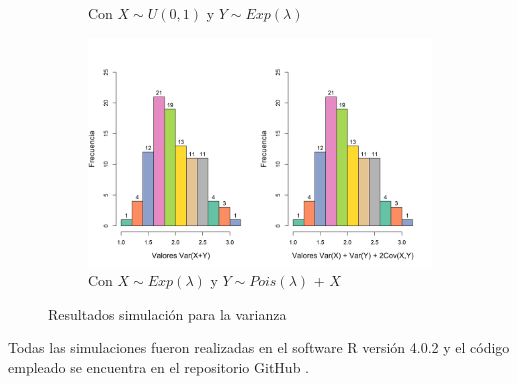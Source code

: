 \documentclass{article}
\begin{document}
\begin{figure}[h]
\begin{center}
\begin{subfigure}[b]{0.5\textwidth}
        \caption{Con $X \sim U(0,1)$ y $Y\sim Exp(\lambda)$}
    \end{subfigure}
    \begin{subfigure}[b]{0.5\textwidth}
        \includegraphics[scale=0.35]{Figures/var-exp-pois.png}
        \caption{Con $X \sim Exp(\lambda)$ y $Y \sim Pois(\lambda)$ + $X$ }
         \label{resultadosVardep}
    \end{subfigure}
    \caption{Resultados simulación para la varianza}
    \label{resultadosVar}
    \end{center}
\end{figure}

Todas las simulaciones fueron realizadas en el software R versión 4.0.2 y el código empleado se encuentra en el repositorio GitHub \cite{github}.



\end{document}
